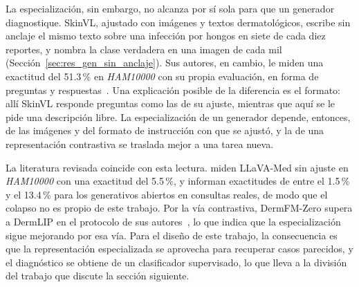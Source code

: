 La especialización, sin embargo, no alcanza por sí sola para que un generador diagnostique. SkinVL, ajustado con
imágenes y textos dermatológicos, escribe sin anclaje el mismo texto sobre una infección por hongos en siete de cada
diez reportes, y nombra la clase verdadera en una imagen de cada mil (Sección~\ref{sec:res_gen_sin_anclaje}). Sus
autores, en cambio, le miden una exactitud del 51.3\,\% en \emph{HAM10000} con su propia evaluación, en forma de
preguntas y respuestas~\cite{zeng2025mmskin}. Una explicación posible de la diferencia es el formato: allí SkinVL
responde preguntas como las de su ajuste, mientras que aquí se le pide una descripción libre. La
especialización de un generador depende, entonces, de las imágenes y del formato de instrucción con que se ajustó, y
la de una representación contrastiva se traslada mejor a una tarea nueva.

La literatura revisada coincide con esta lectura. \textcite{zeng2025mmskin} miden LLaVA-Med sin ajuste en
\emph{HAM10000} con una exactitud del 5.5\,\%, y \textcite{jiang2026multimodal} informan exactitudes de entre el
1.5\,\% y el 13.4\,\% para los generativos abiertos en consultas reales, de modo que el colapso no es propio de este
trabajo. Por la vía contrastiva, DermFM-Zero supera a DermLIP en el protocolo de sus autores~\cite{yan2026dermfmzero},
lo que indica que la especialización sigue mejorando por esa vía. Para el diseño de este trabajo, la consecuencia es
que la representación especializada se aprovecha para recuperar casos parecidos, y el diagnóstico se obtiene de un
clasificador supervisado, lo que lleva a la división del trabajo que discute la sección siguiente.
